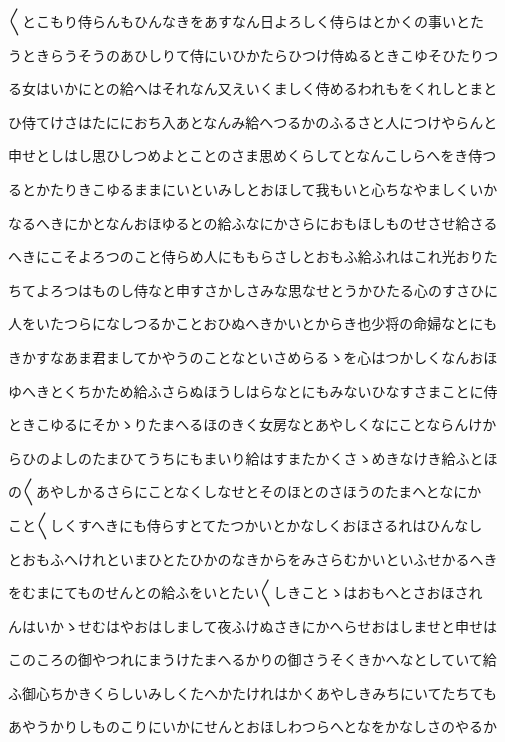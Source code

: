\documentclass[a4paper,11pt,landscape]{ltjtarticle}
\begin{document}
〱とこもり侍らんもひんなきをあすなん日よろしく侍らはとかくの事いとた
\par\medskip
うときらうそうのあひしりて侍にいひかたらひつけ侍ぬるときこゆそひたりつ
\par\medskip
る女はいかにとの給へはそれなん又えいくましく侍めるわれもをくれしとまと
\par\medskip
ひ侍てけさはたににおち入あとなんみ給へつるかのふるさと人につけやらんと
\par\medskip
申せとしはし思ひしつめよとことのさま思めくらしてとなんこしらへをき侍つ
\par\medskip
るとかたりきこゆるままにいといみしとおほして我もいと心ちなやましくいか
\par\medskip
なるへきにかとなんおほゆるとの給ふなにかさらにおもほしものせさせ給さる
\par\medskip
へきにこそよろつのこと侍らめ人にももらさしとおもふ給ふれはこれ光おりた
\par\medskip
ちてよろつはものし侍なと申すさかしさみな思なせとうかひたる心のすさひに
\par\medskip
人をいたつらになしつるかことおひぬへきかいとからき也少将の命婦なとにも
\par\medskip
きかすなあま君ましてかやうのことなといさめらるゝを心はつかしくなんおほ
\par\medskip
ゆへきとくちかため給ふさらぬほうしはらなとにもみないひなすさまことに侍
\par\medskip
ときこゆるにそかゝりたまへるほのきく女房なとあやしくなにことならんけか
\par\medskip
らひのよしのたまひてうちにもまいり給はすまたかくさゝめきなけき給ふとほ
\par\medskip
の〱あやしかるさらにことなくしなせとそのほとのさほうのたまへとなにか
\par\medskip
こと〱しくすへきにも侍らすとてたつかいとかなしくおほさるれはひんなし
\par\medskip
とおもふへけれといまひとたひかのなきからをみさらむかいといふせかるへき
\par\medskip
をむまにてものせんとの給ふをいとたい〱しきことゝはおもへとさおほされ
\par\medskip
んはいかゝせむはやおはしまして夜ふけぬさきにかへらせおはしませと申せは
\par\medskip
このころの御やつれにまうけたまへるかりの御さうそくきかへなとしていて給
\par\medskip
ふ御心ちかきくらしいみしくたへかたけれはかくあやしきみちにいてたちても
\par\medskip
あやうかりしものこりにいかにせんとおほしわつらへとなをかなしさのやるか
\end{document}
